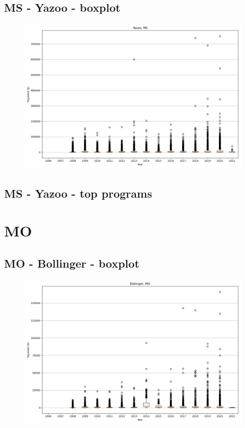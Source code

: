 \subsection*{MS - Yazoo - boxplot}
\begin{figure}[h]
\centering
\includegraphics[width=7in]{../output/boxplots/counties/Yazoo-MS_boxplot.png}
\end{figure}


\subsection*{MS - Yazoo - top programs}

\newpage
\section*{MO}
\subsection*{MO - Bollinger - boxplot}
\begin{figure}[h]
\centering
\includegraphics[width=7in]{../output/boxplots/counties/Bollinger-MO_boxplot.png}
\end{figure}


